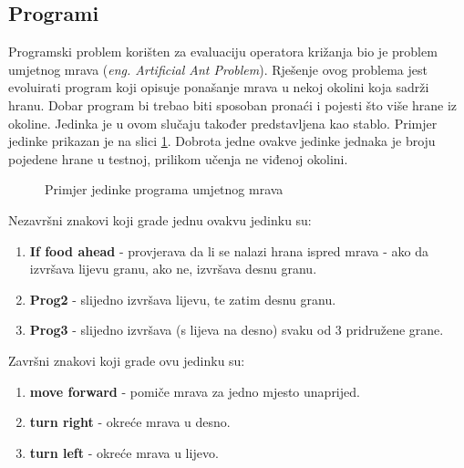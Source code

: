 \subsection{Programi}
Programski problem korišten za evaluaciju operatora križanja bio je problem umjetnog mrava (\textit{eng. Artificial Ant Problem}). Rješenje ovog problema jest evoluirati program koji opisuje ponašanje mrava u nekoj okolini koja sadrži hranu. Dobar program bi trebao biti sposoban pronaći i pojesti što više hrane iz okoline. Jedinka je u ovom slučaju također predstavljena kao stablo. Primjer jedinke prikazan je na slici \ref{ant}. Dobrota jedne ovakve jedinke jednaka je broju pojedene hrane u testnoj, prilikom učenja ne viđenoj okolini.

\begin{figure}[H]
	\centering


	\caption{Primjer jedinke programa umjetnog mrava}
	\label{ant}
\end{figure}

Nezavršni znakovi koji grade jednu ovakvu jedinku su:

\begin{enumerate}

  \item \textbf{If food ahead} - provjerava da li se nalazi hrana ispred mrava - ako da izvršava lijevu granu, ako ne, izvršava desnu granu.
  \item \textbf{Prog2} - slijedno izvršava lijevu, te zatim desnu granu.
  \item \textbf{Prog3} - slijedno izvršava (s lijeva na desno) svaku od 3 pridružene grane.

\end{enumerate}

Završni znakovi koji grade ovu jedinku su:
\begin{enumerate}

  \item \textbf{move forward} - pomiče mrava za jedno mjesto unaprijed.
  \item \textbf{turn right} - okreće mrava u desno.
  \item \textbf{turn left} - okreće mrava u lijevo.

\end{enumerate}

